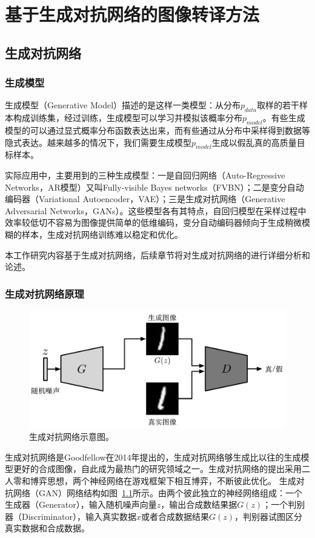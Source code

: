 \chapter{基于生成对抗网络的图像转译方法}
\section{生成对抗网络}
\subsection{生成模型}
生成模型（Generative Model）描述的是这样一类模型：从分布$p_{data}$取样的若干样本构成训练集，经过训练，生成模型可以学习并模拟该概率分布$p_{model}$。有些生成模型的可以通过显式概率分布函数表达出来，而有些通过从分布中采样得到数据等隐式表达。越来越多的情况下，我们需要生成模型$p_{model}$生成以假乱真的高质量目标样本。

实际应用中，主要用到的三种生成模型：一是自回归网络（Auto-Regressive Networks，AR模型）又叫Fully-visible Bayes networks（FVBN）；二是变分自动编码器（Variational Autoencoder，VAE）；三是生成对抗网络（Generative Adversarial Networks，GANs）。这些模型各有其特点，自回归模型在采样过程中效率较低切不容易为图像提供简单的低维编码，变分自动编码器倾向于生成稍微模糊的样本，生成对抗网络训练难以稳定和优化。

本工作研究内容基于生成对抗网络，后续章节将对生成对抗网络的进行详细分析和论述。


\subsection{生成对抗网络原理}
\begin{figure}[ht]
    \centering
	\includegraphics[width=\textwidth]{figures/gan.pdf}
	\caption{生成对抗网络示意图。}
	\label{fig:pic_gan}
\end{figure}
生成对抗网络是Goodfellow在2014年提出的，生成对抗网络够生成比以往的生成模型更好的合成图像，自此成为最热门的研究领域之一。生成对抗网络的提出采用二人零和博弈思想，两个神经网络在游戏框架下相互博弈，不断彼此优化。
生成对抗网络（GAN）网络结构如图~\ref{fig:pic_gan}所示。由两个彼此独立的神经网络组成：一个生成器（Generator），输入随机噪声向量$z$，输出合成数结果据$G(z)$；一个判别器（Discriminator），输入真实数据$x$或者合成数据结果$G(z)$，判别器试图区分真实数据和合成数据。

